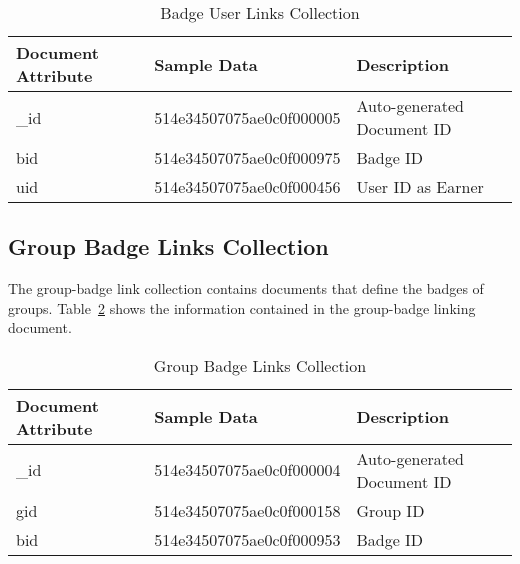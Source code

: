 \begin{table}[H]
\caption{Badge User Links Collection}\label{table:BadgeUserLinksCollection}
\textbf{ }
\begin{center}
\begin{tabular}{ | l | l |  l | }
\hline
Document Attribute & Sample Data & Description \\ \hline
{\_}id & 514e34507075ae0c0f000005 & Auto-generated Document ID \\ \hline
bid & 514e34507075ae0c0f000975 & Badge ID   \\ \hline
uid & 514e34507075ae0c0f000456 & User ID as Earner   \\ \hline
\end{tabular}
\end{center}
\end{table}


\subsection{Group Badge Links Collection}
The group-badge link collection contains documents that define the badges of groups. Table~\ref{table:GroupBadgeLinksCollection} shows the information contained in the group-badge linking document.

\begin{table}[H]
\caption{Group Badge Links Collection}\label{table:GroupBadgeLinksCollection}
\textbf{ }
\begin{center}
\begin{tabular}{ | l | l |  l | }
\hline
Document Attribute & Sample Data & Description \\ \hline
{\_}id & 514e34507075ae0c0f000004 & Auto-generated Document ID \\ \hline
gid & 514e34507075ae0c0f000158 & Group ID   \\ \hline
bid & 514e34507075ae0c0f000953 & Badge ID    \\ \hline
\end{tabular}
\end{center}
\end{table}

